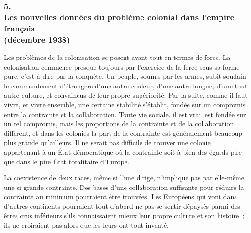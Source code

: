 \documentclass[french,twoside]{book} %
\begin{document}
\subsubsection[5. Les nouvelles données du problème colonial dans l’empire français, (décembre 1938)]{5. \\
Les nouvelles données du problème colonial dans l’empire français \\
(décembre 1938)}
\noindent \par
Les problèmes de la colonisation se posent avant tout en termes de force. La colonisation commence presque toujours par l'exercice de la force sous sa forme pure, c'est-à-dire par la conquête. Un peuple, soumis par les armes, subit soudain le commandement d'étrangers d'une autre couleur, d'une autre langue, d'une tout autre culture, et convaincus de leur propre supériorité. Par la suite, comme il faut vivre, et vivre ensemble, une certaine stabilité s'établit, fondée sur un compromis entre la contrainte et la collaboration. Toute vie sociale, il est vrai, est fondée sur un tel compromis, mais les proportions de la contrainte et de la collaboration diffèrent, et dans les colonies la part de la contrainte est généralement beaucoup plus grande qu'ailleurs. Il ne serait pas difficile de trouver une colonie appartenant à un État démocratique où la contrainte soit à bien des égards pire que dans le pire État totalitaire d'Europe.\par
La coexistence de deux races, même si l'une dirige, n'implique pas par elle-même une si grande contrainte. Des bases d'une collaboration suffisante pour réduire la contrainte au minimum pourraient être trouvées. Les Européens qui vont dans d'autres continents pourraient tout d'abord ne pas se sentir dépaysés parmi des êtres crus inférieurs s'ils connaissaient mieux leur propre culture et son histoire ; ils ne croiraient pas alors que les leurs ont tout inventé.\par
\end{document}
